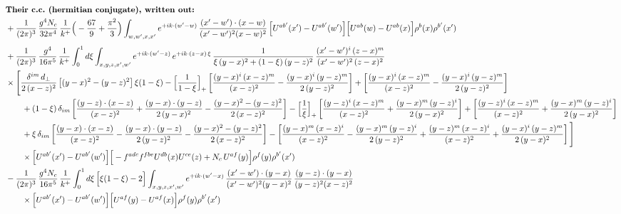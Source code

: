 \documentclass[10pt]{article}
\numberwithin{equation}{section}
\begin{document}
\begin{align}
&\textbf{Their c.c.\ (hermitian conjugate), written out:}\notag\\
&+\frac{1}{(2\pi)^{3}}\,\frac{g^{4}N_{c}}{32\pi^{4}}\,\frac{1}{k^{+}}\Big(-\frac{67}{9}+\frac{\pi^{2}}{3}\Big)\int_{w,w^{\prime},x,x^{\prime}}e^{+ik\cdot (w^{\prime}-w)}\,\frac{(x^{\prime}-w^{\prime})\cdot(x-w)}{(x^{\prime}-w^{\prime})^{2}(x-w)^{2}}\,\Big[U^{ab^{\prime}}(x^{\prime})-U^{ab^{\prime}}(w^{\prime})\Big]\Big[U^{ab}(w)-U^{ab}(x)\Big]\rho^{b}(x)\rho^{b^{\prime}}(x^{\prime})\notag\\[4pt]
&+\frac{1}{(2\pi)^{3}}\,\frac{g^{4}}{16\pi^{5}}\,\frac{1}{k^{+}}\int_{0}^{1}d\xi\int_{x,y,z,x^{\prime},w^{\prime}}e^{+ik\cdot (w^{\prime}-z)}\,e^{+ik\cdot (z-x)\,\xi}\,\frac{1}{\xi\,(y-x)^{2}+(1-\xi)\,(y-z)^{2}}\,\frac{(x^{\prime}-w^{\prime})^{i}\,(z-x)^{m}}{(x^{\prime}-w^{\prime})^{2}\,(z-x)^{2}}\notag\\
&\times\Bigg[\frac{\delta^{im}\,d_{\perp}}{2\,(x-z)^{2}}\left[(y-x)^{2}-(y-z)^{2}\right]\xi(1-\xi)
-\Big[\frac{1}{1-\xi}\Big]_{+}\left[\frac{(y-x)^{i}\,(x-z)^{m}}{(x-z)^{2}}-\frac{(y-x)^{i}\,(y-z)^{m}}{2\,(y-z)^{2}}\right]
+\left[\frac{(y-x)^{i}\,(x-z)^{m}}{(x-z)^{2}}-\frac{(y-x)^{i}\,(y-z)^{m}}{2\,(y-z)^{2}}\right]\notag\\
&\qquad+(1-\xi)\,\delta_{im}\left[\frac{(y-z)\cdot(x-z)}{(x-z)^{2}}+\frac{(y-x)\cdot(y-z)}{2\,(y-x)^{2}}-\frac{(y-x)^{2}-(y-z)^{2}}{2\,(x-z)^{2}}\right]
-\Big[\frac{1}{\xi}\Big]_{+}\left[\frac{(y-z)^{i}\,(x-z)^{m}}{(x-z)^{2}}+\frac{(y-x)^{m}\,(y-z)^{i}}{2\,(y-x)^{2}}\right]+\left[\frac{(y-z)^{i}\,(x-z)^{m}}{(x-z)^{2}}+\frac{(y-x)^{m}\,(y-z)^{i}}{2\,(y-x)^{2}}\right]\notag\\
&\qquad+\xi\,\delta_{im}\left[\frac{(y-x)\cdot(x-z)}{(x-z)^{2}}-\frac{(y-x)\cdot(y-z)}{2\,(y-z)^{2}}-\frac{(y-x)^{2}-(y-z)^{2}}{2\,(x-z)^{2}}\right]
-\left[\frac{(y-x)^{m}\,(x-z)^{i}}{(x-z)^{2}}-\frac{(y-x)^{m}\,(y-z)^{i}}{2\,(y-z)^{2}}+\frac{(y-z)^{m}\,(x-z)^{i}}{(x-z)^{2}}+\frac{(y-x)^{i}\,(y-z)^{m}}{2\,(y-x)^{2}}\right]\Bigg]\notag\\
&\qquad\times\Big[U^{ab^{\prime}}(x^{\prime})-U^{ab^{\prime}}(w^{\prime})\Big]\Big[-f^{adc}f^{fbe}U^{db}(x)U^{ce}(z)+N_{c}\,U^{af}(y)\Big]\rho^{f}(y)\rho^{b^{\prime}}(x^{\prime})\notag\\
&-\frac{1}{(2\pi)^{3}}\,\frac{g^{4}N_{c}}{16\pi^{5}}\,\frac{1}{k^{+}}\int_{0}^{1}d\xi\,\Big[\xi(1-\xi)-2\Big]\int_{x,y,z,x^{\prime},w^{\prime}}e^{+ik\cdot (w^{\prime}-x)}\,\frac{(x^{\prime}-w^{\prime})\cdot(y-x)}{(x^{\prime}-w^{\prime})^{2}(y-x)^{2}}\,\frac{(y-z)\cdot(y-x)}{(y-z)^{2}(x-z)^{2}}\notag\\&\qquad\times\Big[U^{ab^{\prime}}(x^{\prime})-U^{ab^{\prime}}(w^{\prime})\Big]\Big[U^{af}(y)-U^{af}(x)\Big]\rho^{f}(y)\rho^{b^{\prime}}(x^{\prime})\notag\\[4pt]

\end{align}
\end{document}
